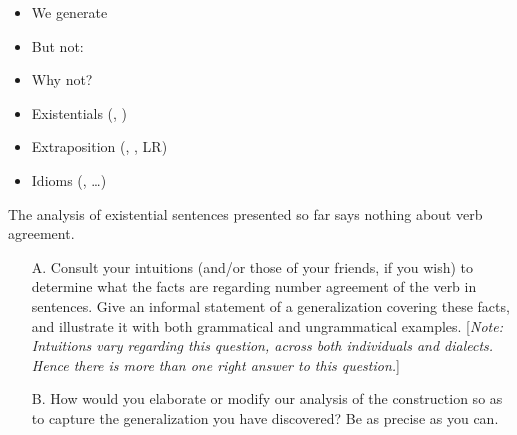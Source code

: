 \documentclass[a4paper,landscape,headrule,footrule]{foils}
\begin{document}


\begin{itemize}
\item We generate
\begin{exe} 
  \ex {}
  \ex {}
\end{exe}
\item But not:
  \begin{exe} 
    \ex {}
  \end{exe}
\item Why not?
\end{itemize}


\begin{itemize}
\item Existentials (, )
\item Extraposition (, , LR)
\item Idioms (, \ldots)
\end{itemize}


The analysis of existential  sentences presented so far
says nothing about verb agreement.

\begin{itemize}
\item[A.] Consult your intuitions (and/or those of your friends, if
  you wish) to determine what the facts are regarding number
 agreement of the verb in  sentences.
 Give an informal statement of a generalization covering these facts,
 and illustrate it with both grammatical and ungrammatical examples.
 [{\sl Note: Intuitions vary regarding this question, across both
    individuals and  dialects.  Hence there is more
    than one right answer to this question.}]

\item[B.] How would you elaborate or modify our analysis of the 
  construction so as to capture the generalization you have discovered?
  Be as precise as you can.
\end{itemize}


\end{document}
